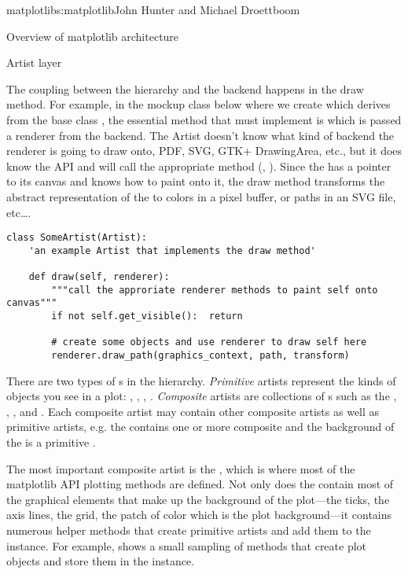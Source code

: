 \begin{aosachapter}{matplotlib}{s:matplotlib}{John Hunter and Michael Droettboom}
\begin{aosasect1}{Overview of matplotlib architecture}
\begin{aosasect2}{Artist layer}


The coupling between the  hierarchy and the backend
happens in the draw method.  For example, in the mockup class below
where we create  which derives from the base class
, the essential method that  must
implement is  which is passed a renderer from the backend.
The Artist doesn't know what kind of backend the renderer is going to
draw onto, PDF, SVG, GTK+ DrawingArea, etc., but it does know the
 API and will call the appropriate method
(, ).  Since the  has
a pointer to its canvas and knows how to paint onto it, the draw
method transforms the abstract representation of the  to
colors in a pixel buffer, or paths in an SVG file, etc\dots{}.

\begin{verbatim}
class SomeArtist(Artist):
    'an example Artist that implements the draw method'

    def draw(self, renderer):
        """call the approriate renderer methods to paint self onto canvas"""
        if not self.get_visible():  return

        # create some objects and use renderer to draw self here
        renderer.draw_path(graphics_context, path, transform)

\end{verbatim}

There are two types of s in the
hierarchy. \emph{Primitive} artists represent the kinds of objects you
see in a plot: , , ,
.  \emph{Composite} artists are collections of
s such as the , , , and
.  Each composite artist may contain other composite
artists as well as primitive artists, e.g. the  contains
one or more composite  and the background of the
 is a primitive .

The most important composite artist is the , which is where most
of the matplotlib API plotting methods are defined.  Not only does the
 contain most of the graphical elements that make up the
background of the plot---the ticks, the axis lines, the grid, the
patch of color which is the plot background---it contains numerous
helper methods that create primitive artists and add them to the 
instance.  For example,  shows
a small sampling of  methods that create plot objects and store
them in the  instance.


\end{aosasect2}
\end{aosasect1}
\end{aosachapter}
